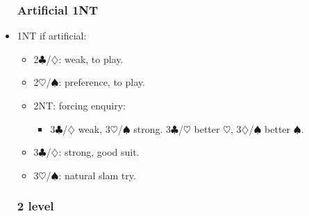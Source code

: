 \documentclass[a4paper,14pt]{extarticle}
\begin{document}
\begin{itemize}
\newpage

\subsubsection{Artificial 1NT}
\label{sec:resp:1nart}

\item 1NT if artificial:
	\begin{itemize}
   \item 2$\clubsuit$/$\diamondsuit$: weak, to play.
   \item 2$\heartsuit$/$\spadesuit$: preference, to play.
   \item 2NT: forcing enquiry:
		\begin{itemize}
      \item 3$\clubsuit$/$\diamondsuit$ weak, 3$\heartsuit$/$\spadesuit$ strong. 3$\clubsuit$/$\heartsuit$ better $\heartsuit$, 3$\diamondsuit$/$\spadesuit$ better $\spadesuit$.
		\end{itemize}
   \item 3$\clubsuit$/$\diamondsuit$: strong, good suit.
   \item 3$\heartsuit$/$\spadesuit$: natural slam try.
	\end{itemize}

\newpage

\subsubsection{2 level}
\label{sec:resp:2level}


\end{itemize}
\end{document}
